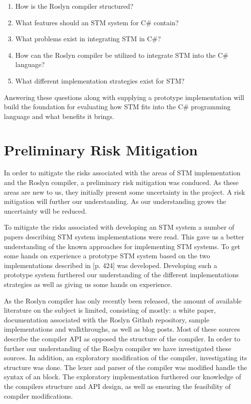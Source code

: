 \begin{enumerate}
\item How is the Roslyn compiler structured?
\item What features should an \ac{STM} system for C\# contain?
\item What problems exist in integrating \ac{STM} in C\#?
\item How can the Roslyn compiler be utilized to integrate \ac{STM} into the C\# language?
\item What different implementation strategies exist for \ac{STM}?
\end{enumerate}

Answering these questions along with supplying a prototype implementation will build the foundation for evaluating how \ac{STM} fits into the C\# programming language and what benefits it brings.
 
\section{Preliminary Risk Mitigation}
In order to mitigate the risks associated with the areas of \ac{STM} implementation and the Roslyn compiler, a preliminary risk mitigation was conduced. As these areas are new to us, they initially present some uncertainty in the project. A risk mitigation will further our understanding. As our understanding grows the uncertainty will be reduced.

To mitigate the risks associated with developing an \ac{STM} system a number of papers describing \ac{STM} system implementations were read. This gave us a better understanding of the known approaches for implementing \ac{STM} systems. To get some hands on experience a prototype \ac{STM} system based on the two implementations described in \cite{herlihy2012art}[p. 424] was developed. Developing such a prototype system furthered our understanding of the different implementations strategies as well as giving us some hands on experience.

As the Roslyn compiler has only recently been released, the amount of available literature on the subject is limited, consisting of mostly: a white paper\cite{ng2012roslyn}, documentation associated with the Roslyn Github repository\cite{roslynwiki}, sample implementations and walkthroughs\cite{roslynsamples}, as well as blog posts. Most of these sources describe the compiler \ac{API} as opposed the structure of the compiler. In order to further our understanding of the Roslyn compiler we have investigated these sources. In addition, an exploratory modification of the compiler, investigating its structure was done. The lexer and parser of the compiler was modified handle the syntax of an  block. The exploratory implementation furthered our knowledge of the compilers structure and \ac{API} design, as well as ensuring the feasibility of compiler modifications.


\worksheetend